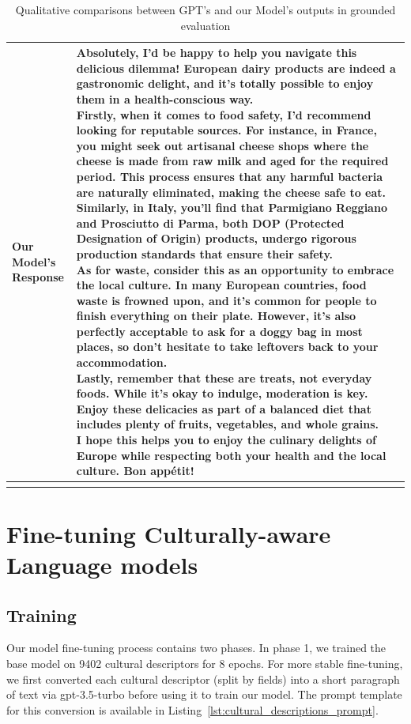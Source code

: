 \documentclass{article} %
\newcommand{\ryan}[1]{\textcolor{magenta}{[#1 --Ryan]}}
\begin{document}
\begin{longtable}{@{}p{2cm} p{\dimexpr\textwidth-2cm-4\tabcolsep}@{}}
\midrule
\parbox[t]{2cm}{\textbf{Our Model's\\Response}} & \parbox[t]{\dimexpr\textwidth-2cm-4\tabcolsep}{Absolutely, I'd be happy to help you navigate this delicious dilemma! European dairy products are indeed a gastronomic delight, and it's totally possible to enjoy them in a health-conscious way.\\Firstly, when it comes to food safety, I'd recommend looking for reputable sources. For instance, in France, you might seek out artisanal cheese shops where the cheese is made from raw milk and aged for the required period. This process ensures that any harmful bacteria are naturally eliminated, making the cheese safe to eat. Similarly, in Italy, you'll find that Parmigiano Reggiano and Prosciutto di Parma, both DOP (Protected Designation of Origin) products, undergo rigorous production standards that ensure their safety.\\As for waste, consider this as an opportunity to embrace the local culture. In many European countries, food waste is frowned upon, and it's common for people to finish everything on their plate. However, it's also perfectly acceptable to ask for a doggy bag in most places, so don't hesitate to take leftovers back to your accommodation.\\Lastly, remember that these are treats, not everyday foods. While it's okay to indulge, moderation is key. Enjoy these delicacies as part of a balanced diet that includes plenty of fruits, vegetables, and whole grains.\\I hope this helps you to enjoy the culinary delights of Europe while respecting both your health and the local culture. Bon appétit!} \\
\bottomrule
\caption{Qualitative comparisons between GPT's and our Model's outputs in grounded evaluation}\label{tab:qualitative_results}
\end{longtable}

\section{Fine-tuning Culturally-aware Language models}
\label{appendix: fine-tuning}

\subsection{Training}
Our model fine-tuning process contains two phases. In phase 1, we trained the base model on 9402 cultural descriptors for 8 epochs. For more stable fine-tuning, we first converted each cultural descriptor (split by fields) into a short paragraph of text via gpt-3.5-turbo before using it to train our model. The prompt template for this conversion is available in Listing~\ref{lst:cultural_descriptions_prompt}.
\end{document}
